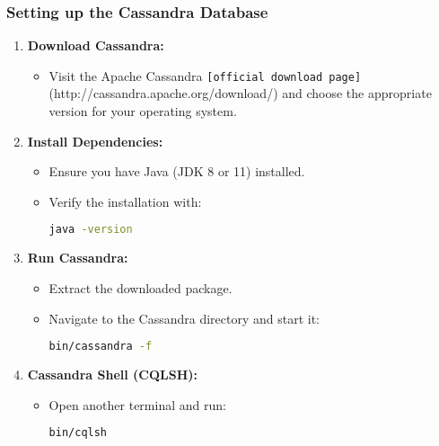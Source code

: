 \documentclass[aspectratio=169]{beamer}
\begin{document}
\begin{frame}[fragile]
    \frametitle{Setting up the Cassandra Database}
    \begin{enumerate}
        \item \textbf{Download Cassandra:}
        \begin{itemize}
            \item Visit the Apache Cassandra \texttt{[official download page]}(http://cassandra.apache.org/download/) and choose the appropriate version for your operating system.
        \end{itemize}
        
        \item \textbf{Install Dependencies:}
        \begin{itemize}
            \item Ensure you have Java (JDK 8 or 11) installed.
            \item Verify the installation with:
            \begin{lstlisting}[language=bash]
            java -version
            \end{lstlisting}
        \end{itemize}
        
        \item \textbf{Run Cassandra:}
        \begin{itemize}
            \item Extract the downloaded package.
            \item Navigate to the Cassandra directory and start it:
            \begin{lstlisting}[language=bash]
            bin/cassandra -f
            \end{lstlisting}
        \end{itemize}
        
        \item \textbf{Cassandra Shell (CQLSH):}
        \begin{itemize}
            \item Open another terminal and run:
            \begin{lstlisting}[language=bash]
            bin/cqlsh
            \end{lstlisting}
        \end{itemize}
    \end{enumerate}
\end{frame}
\end{document}

